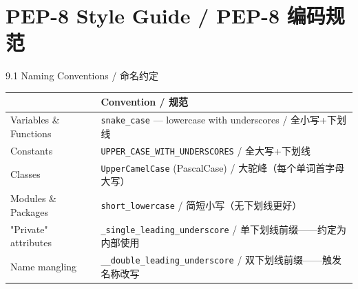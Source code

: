 \documentclass[11pt,a4paper]{report}
\let\oldtexttt\texttt
\renewcommand{\texttt}[1]{\textcolor{mainblue}{\oldtexttt{#1}}}
\begin{document}
\newpage

\chapter{PEP-8 Style Guide / PEP-8 编码规范}

\begin{cmdsection}{9.1  Naming Conventions / 命名约定}
\normalsize\renewcommand{\arraystretch}{1.4}
\centering
\begin{tabularx}{\textwidth}{@{}>{\ttfamily}l>{\raggedright\arraybackslash}X@{}}
\toprule
\multicolumn{1}{@{}l}{\textbf{Element}} & \textbf{Convention / 规范} \\ \midrule
Variables \& Functions   & \texttt{snake\_case} — lowercase with underscores / 全小写+下划线 \\
Constants               & \texttt{UPPER\_CASE\_WITH\_UNDERSCORES} / 全大写+下划线 \\
Classes                 & \texttt{UpperCamelCase} (PascalCase) / 大驼峰（每个单词首字母大写） \\
Modules \& Packages     & \texttt{short\_lowercase} / 简短小写（无下划线更好） \\
"Private" attributes    & \texttt{\_single\_leading\_underscore} / 单下划线前缀——约定为内部使用 \\
Name mangling           & \texttt{\_\_double\_leading\_underscore} / 双下划线前缀——触发名称改写 \\
\bottomrule
\end{tabularx}
\end{cmdsection}
\end{document}

